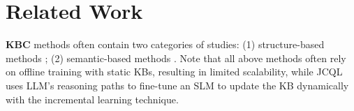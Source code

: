 \documentclass[11pt]{article}
\begin{document}
\section{Related Work}
\textbf{KBC} methods often contain two categories of studies: (1) structure-based methods \cite{bordes2013,yang2015,trouillon2016complex,sun2018rotate,xiao2024knowledge,GoldE}; (2) semantic-based methods
\cite{wang-etal-2022-simkgc, chen-etal-2023-dipping, saxena2022kgt5, lihui2022binet, liu2024finetuninggenerativelargelanguage}. 
Note that all above methods often rely on offline training with static KBs, resulting in limited scalability, while JCQL uses LLM's reasoning paths to fine-tune an SLM to update the KB dynamically with the incremental learning technique.
\end{document}
